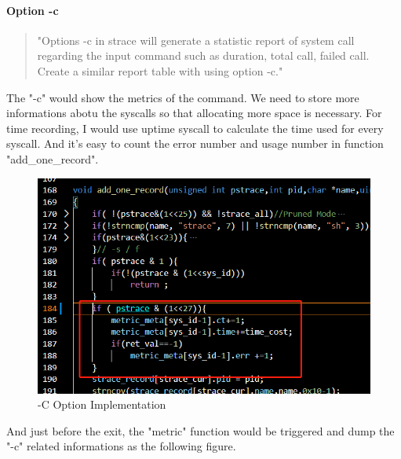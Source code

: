 \documentclass[11pt,oneside,a4paper]{article}
\begin{document}
\paragraph*{Option -c}
\begin{quotation}
    "Options -c in strace will generate a statistic report of system call regarding the input command
    such as duration, total call, failed call. Create a similar report table with using option -c."
\end{quotation}

The "-c" would show the metrics of the command. We need to store more informations abotu 
the syscalls so that allocating more space is necessary. 
For time recording, I would use uptime syscall to calculate the time used for every syscall.
And it's easy to count the error number and usage number in function "add\_one\_record".
\begin{figure}[H]
    \includegraphics[width=4.75in]{1-30.png}
    \centering
    \caption{-C Option Implementation}
\end{figure}
And just before the exit, the "metric" function would be triggered and dump the "-c" 
related informations as the following figure.
\end{document}
